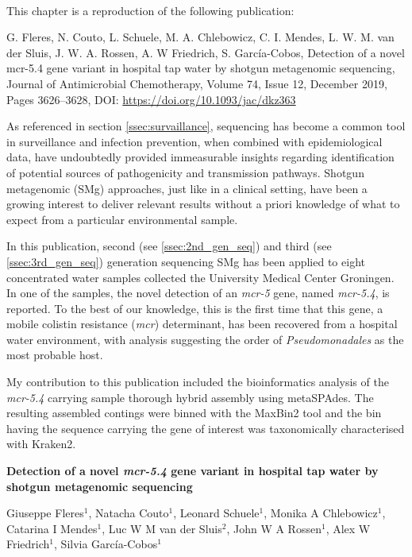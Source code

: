 \mbox{}\\
\vspace{8cm}

This chapter is a reproduction of the following publication:

G. Fleres, N. Couto, L. Schuele, M. A. Chlebowicz, C. I. Mendes, L. W. M. van der Sluis, J. W. A. Rossen, A. W Friedrich, S. García-Cobos, Detection of a novel mcr-5.4 gene variant in hospital tap water by shotgun metagenomic sequencing, Journal of Antimicrobial Chemotherapy, Volume 74, Issue 12, December 2019, Pages 3626–3628, DOI: \url{https://doi.org/10.1093/jac/dkz363}

As referenced in section \ref{ssec:survaillance}, sequencing has become a common tool in surveillance and infection prevention, when combined with epidemiological data, have undoubtedly provided immeasurable insights regarding identification of potential sources of pathogenicity and transmission pathways. Shotgun metagenomic (SMg) approaches, just like in a clinical setting,  have been a growing interest to deliver relevant results without a priori knowledge of what to expect from a particular environmental sample. 

In this publication, second (see \ref{ssec:2nd_gen_seq}) and third (see \ref{ssec:3rd_gen_seq}) generation sequencing SMg has been applied to eight concentrated water samples collected the University Medical Center Groningen. In one of the samples, the novel detection of an \textit{mcr-5} gene, named \textit{mcr-5.4}, is reported. To the best of our knowledge, this is the first time that this gene, a mobile colistin resistance (\textit{mcr}) determinant, has been recovered from a hospital water environment, with analysis suggesting the order of \textit{Pseudomonadales} as the most probable host. 

My contribution to this publication included the bioinformatics analysis of the \textit{mcr-5.4} carrying sample thorough hybrid assembly using metaSPAdes. The resulting assembled contings were binned with the MaxBin2 tool and the bin having the sequence carrying the gene of interest was taxonomically characterised with Kraken2.


\cleardoublepage 

\begin{center}
\large
\textbf{Detection of a novel \textit{mcr-5.4} gene
variant in hospital tap water by
shotgun metagenomic sequencing}
\end{center}

Giuseppe Fleres$^1$, 
Natacha Couto$^1$, 
Leonard Schuele$^1$,
Monika A Chlebowicz$^1$,
Catarina I Mendes$^1$,
Luc W M van der Sluis$^2$, 
John W A Rossen$^1$, 
Alex W Friedrich$^1$, 
Silvia García-Cobos$^1$

